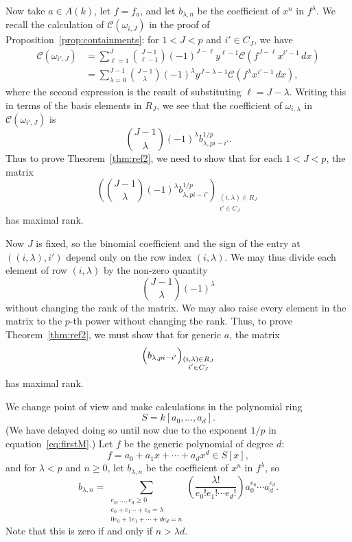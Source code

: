 \documentclass[12pt,reqno]{amsart}
\numberwithin{equation}{section}
\theoremstyle{plain}
\theoremstyle{definition}
\theoremstyle{remark}
\numberwithin{equation}{section}
\newcommand{\CC}{\mathcal{C}}
\newcommand{\<}{\langle}
\renewcommand{\>}{\rangle}
\begin{document}
Now take $a\in A(k)$, let $f=f_a$, and let $b_{\lambda,n}$ be the
coefficient of $x^n$ in $f^{\lambda}$.  We recall the calculation of
$\CC(\omega_{i,J})$ in the proof of
Proposition~\ref{prop:containments}: for $1<J<p$ and $i'\in C_J$,
we have
\begin{align*}
\CC(\omega_{i',J})
  &=\sum_{\ell=1}^J\binom{J-1}{\ell-1}(-1)^{J-\ell}
    y^{\ell-1}\CC\left(f^{J-\ell}x^{i'-1}\,dx\right)\\
  &=\sum_{\lambda=0}^{J-1}\binom{J-1}{\lambda}(-1)^\lambda
    y^{J-\lambda-1}\CC\left(f^\lambda x^{i'-1}\,dx\right),
\end{align*}
where the second expression is the result of substituting
$\ell=J-\lambda$.  Writing this in terms of the basis elements in
$R_J$, we see that the coefficient of $\omega_{i,\lambda}$ in
$\CC(\omega_{i',J})$ is
\[\binom{J-1}{\lambda}(-1)^\lambda b_{\lambda,pi-i'}^{1/p}.\] 
Thus to prove Theorem~\ref{thm:ref2}, we need to show that for each
$1<J<p$, the matrix 
\begin{equation}\label{eq:firstM}
  \left(\binom{J-1}{\lambda}(-1)^\lambda
  b_{\lambda,pi-i'}^{1/p}\right)_{\substack{(i,\lambda)\in R_J\\ i'\in C_J}}  
\end{equation}
has maximal rank.


Now $J$ is fixed, so the binomial coefficient and the sign of the
entry at $((i,\lambda),i')$ depend only on the row index
$(i,\lambda)$.  We may thus divide each element of row $(i,\lambda)$
by the non-zero quantity
\[\binom{J-1}{\lambda}(-1)^\lambda\]
without changing the rank of the matrix.  We may also raise every
element in the matrix to the $p$-th power without changing the rank.
Thus, to prove Theorem~\ref{thm:ref2}, we must show that for generic
$a$, the matrix
\begin{equation}\label{eq:M-special}
\Bigl(b_{\lambda,pi-i'}\Bigr)_{\substack{(i,\lambda)\in R_J\\ i'\in C_J}}  
\end{equation}
has maximal rank.

We change point of view and make calculations in the polynomial ring
\[S=k[a_0,\dots,a_d].\]
(We have delayed doing so until now due to the exponent $1/p$ in
equation~\eqref{eq:firstM}.)  Let $f$ be the generic polynomial of
degree $d$:
\[f=a_0+a_1x+\cdots+a_dx^d\in S[x],\]
and for $\lambda<p$ and $n\ge0$, let $b_{\lambda,n}$ be the coefficient of
$x^n$ in $f^\lambda$, so
\[b_{\lambda,n}=\sum_{\substack{e_0,\dots,e_d\ge0\\
      e_0+e_1\cdots+e_d=\lambda
      \\0e_0+1e_1+\cdots+de_d=n}}
  \left(\frac{\lambda!}{e_0!e_1!\cdots e_d!}\right)a_0^{e_0}\cdots a_d^{e_d}.\]
Note that this is zero if and only if $n>\lambda d$.
\end{document}
